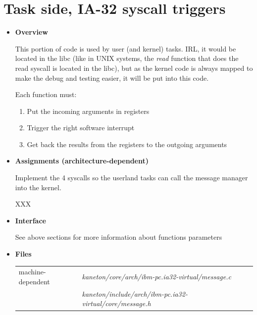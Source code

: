 \newpage

\section{Task side, \textbf{IA-32 syscall triggers}}
\begin{itemize}
  \item {\bf Overview}

    This portion of code is used by user (and kernel) tasks. IRL,
    it would be located in the libc (like in UNIX systems, the
    \emph{read} function that does the read syscall is located in the
    libc), but as the kernel code is always mapped to make the debug
    and testing easier, it will be put into this code.

    Each function must:

    \begin{enumerate}
      \item Put the incoming arguments in registers
      \item Trigger the right software interrupt
      \item Get back the results from the registers to the outgoing arguments
    \end{enumerate}

  \item {\bf Assignments (architecture-dependent)}

    Implement the 4 syscalls so the userland tasks can call the
    message manager into the kernel.

    XXX

  \item {\bf Interface}

	     {}
		  {}
		  {}
		  {}

		  See above sections for more information about functions
		  parameters

  \item {\bf {Files}}

    \begin{tabular}{| l | l |}
      \hline
      machine-dependent & {\em kaneton/core/arch/ibm-pc.ia32-virtual/message.c}\\
      & {\em kaneton/include/arch/ibm-pc.ia32-virtual/core/message.h}\\\hline
    \end{tabular}

\end{itemize}

